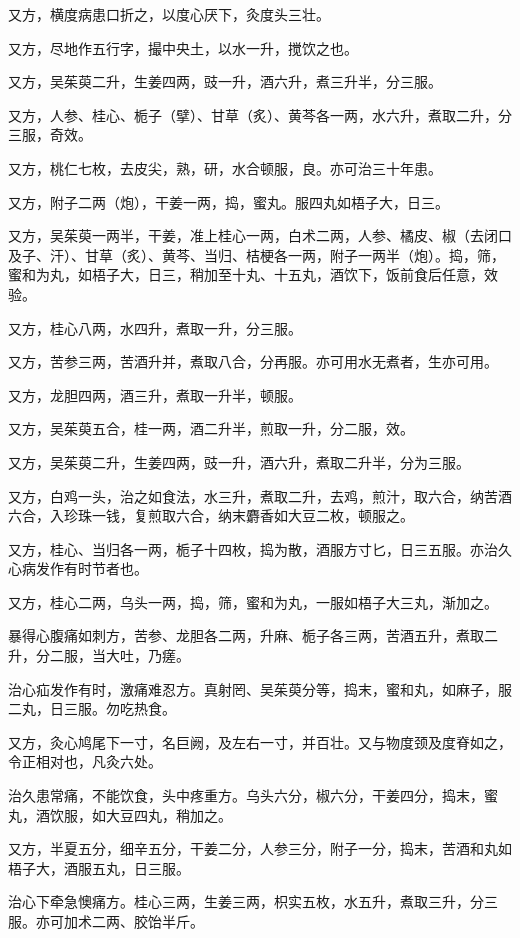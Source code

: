 \documentclass[12pt,UTF8]{ctexbook}
\begin{document}
又方，横度病患口折之，以度心厌下，灸度头三壮。

又方，尽地作五行字，撮中央土，以水一升，搅饮之也。

又方，吴茱萸二升，生姜四两，豉一升，酒六升，煮三升半，分三服。

又方，人参、桂心、栀子（擘）、甘草（炙）、黄芩各一两，水六升，煮取二升，分三服，奇效。

又方，桃仁七枚，去皮尖，熟，研，水合顿服，良。亦可治三十年患。

又方，附子二两（炮），干姜一两，捣，蜜丸。服四丸如梧子大，日三。

又方，吴茱萸一两半，干姜，准上桂心一两，白术二两，人参、橘皮、椒（去闭口及子、汗）、甘草（炙）、黄芩、当归、桔梗各一两，附子一两半（炮）。捣，筛，蜜和为丸，如梧子大，日三，稍加至十丸、十五丸，酒饮下，饭前食后任意，效验。

又方，桂心八两，水四升，煮取一升，分三服。

又方，苦参三两，苦酒升并，煮取八合，分再服。亦可用水无煮者，生亦可用。

又方，龙胆四两，酒三升，煮取一升半，顿服。

又方，吴茱萸五合，桂一两，酒二升半，煎取一升，分二服，效。

又方，吴茱萸二升，生姜四两，豉一升，酒六升，煮取二升半，分为三服。

又方，白鸡一头，治之如食法，水三升，煮取二升，去鸡，煎汁，取六合，纳苦酒六合，入珍珠一钱，复煎取六合，纳末麝香如大豆二枚，顿服之。

又方，桂心、当归各一两，栀子十四枚，捣为散，酒服方寸匕，日三五服。亦治久心病发作有时节者也。

又方，桂心二两，乌头一两，捣，筛，蜜和为丸，一服如梧子大三丸，渐加之。

暴得心腹痛如刺方，苦参、龙胆各二两，升麻、栀子各三两，苦酒五升，煮取二升，分二服，当大吐，乃瘥。

治心疝发作有时，激痛难忍方。真射罔、吴茱萸分等，捣末，蜜和丸，如麻子，服二丸，日三服。勿吃热食。

又方，灸心鸠尾下一寸，名巨阙，及左右一寸，并百壮。又与物度颈及度脊如之，令正相对也，凡灸六处。

治久患常痛，不能饮食，头中疼重方。乌头六分，椒六分，干姜四分，捣末，蜜丸，酒饮服，如大豆四丸，稍加之。

又方，半夏五分，细辛五分，干姜二分，人参三分，附子一分，捣末，苦酒和丸如梧子大，酒服五丸，日三服。

治心下牵急懊痛方。桂心三两，生姜三两，枳实五枚，水五升，煮取三升，分三服。亦可加术二两、胶饴半斤。
\end{document}
